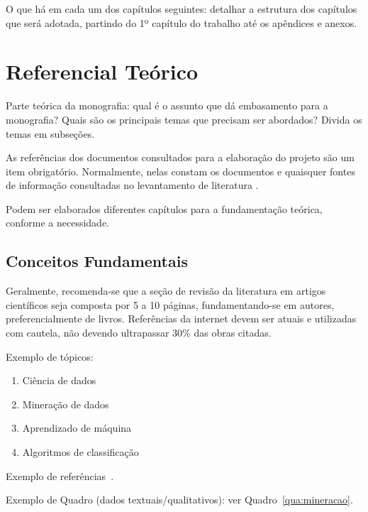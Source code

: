 \documentclass[
	12pt,				    %
	openright,			    %
	oneside,			    %
	a4paper,			    %
    sumario=tradicional,    %
	english,			    %
	brazil,				    %
	]{abntex2}
\let\cite\parencite
\begin{document}
O que há em cada um dos capítulos seguintes: detalhar a estrutura dos capítulos que será adotada, partindo do 1º capítulo do trabalho até os apêndices e anexos.

\chapter{Referencial Teórico}\label{sec:RefTeorico}

Parte teórica da monografia: qual é o assunto que dá embasamento para a monografia? Quais são os principais temas que precisam ser abordados? Divida os temas em subseções. 

As referências dos documentos consultados para a elaboração do projeto são um item obrigatório. Normalmente, nelas constam os documentos e quaisquer fontes de informação consultadas no levantamento de literatura \cite{rev2019}. 

Podem ser elaborados diferentes capítulos para a fundamentação teórica, conforme a necessidade.

\section{Conceitos Fundamentais}

Geralmente, recomenda-se que a seção de revisão da literatura em artigos científicos seja composta por 5 a 10 páginas, fundamentando-se em autores, preferencialmente de livros. Referências da internet devem ser atuais e utilizadas com cautela, não devendo ultrapassar 30\% das obras citadas.

Exemplo de tópicos:

\begin{enumerate}
    \item Ciência de dados
    \item Mineração de dados
    \item Aprendizado de máquina
    \item Algoritmos de classificação
\end{enumerate}

Exemplo de refer\^encias~\cite{tese2019, confinter2019, confnac2019, site2019}.

Exemplo de Quadro (dados textuais/qualitativos): ver Quadro~\ref{qua:mineracao}.
\end{document}
